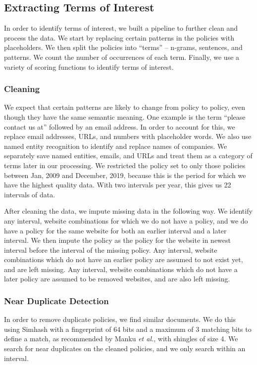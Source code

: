 \subsection{Extracting Terms of Interest}
\label{sec:sec:analysis}
In order to identify terms of interest, we built a pipeline to further clean and process the data. We start by replacing certain patterns in the policies with placeholders. We then split the policies into ``terms'' -- n-grams, sentences, and patterns. We count the number of occurrences of each term. Finally, we use a variety of scoring functions to identify terms of interest.

\subsubsection{Cleaning}
We expect that certain patterns are likely to change from policy to policy, even though they have the same semantic meaning. One example is the term ``please contact us at'' followed by an email address. In order to account for this, we replace email addresses, URLs, and numbers with placeholder words. We also use named entity recognition to identify and replace names of companies. We separately save named entities, emails, and URLs and treat them as a category of terms later in our processing. We restricted the policy set to only those policies between Jan, 2009 and December, 2019, because this is the period for which we have the highest quality data. With two intervals per year, this gives us 22 intervals of data.

After cleaning the data, we impute missing data in the following way. We identify any interval, website combinations for which we do not have a policy, and we do have a policy for the same website for both an earlier interval and a later interval. We then impute the policy as the policy for the website in newest interval before the interval of the missing policy. Any interval, website combinations which do not have an earlier policy are assumed to not exist yet, and are left missing. Any interval, website combinations which do not have a later policy are assumed to be removed websites, and are also left missing. 



\subsubsection{Near Duplicate Detection}
In order to remove duplicate policies, we find similar documents. We do this using Simhash\cite{henzinger2006finding}\cite{SimhashPy} with a fingerprint of 64 bits and a maximum of 3 matching bits to define a match, as recommended by Manku \textit{et al.}\cite{manku2007detecting}, with shingles of size 4. We search for near duplicates on the cleaned policies, and we only search within an interval.

